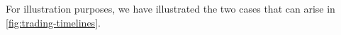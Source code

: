 For illustration purposes, we have illustrated the two cases that can arise in \cref{fig:trading-timelines}. 








